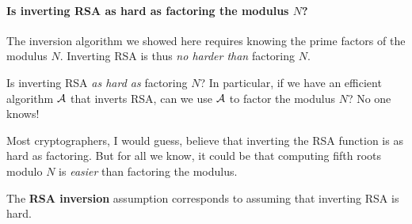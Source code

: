 \paragraph{Is inverting RSA as hard as factoring the modulus $N$?}
The inversion algorithm we showed here requires knowing the prime factors
of the modulus $N$.
Inverting RSA is thus \emph{no harder than} factoring $N$.

Is inverting RSA \emph{as hard as} factoring $N$?
In particular, if we have an efficient algorithm $\mathcal{A}$ that inverts
RSA, can we use $\mathcal{A}$ to factor the modulus $N$?
No one knows!

Most cryptographers, I would guess, believe that inverting the RSA function
is as hard as factoring.
But for all we know, it could be that computing fifth roots modulo $N$ is \emph{easier}
than factoring the modulus.

The \textbf{RSA inversion} assumption corresponds to assuming that inverting RSA is hard.
